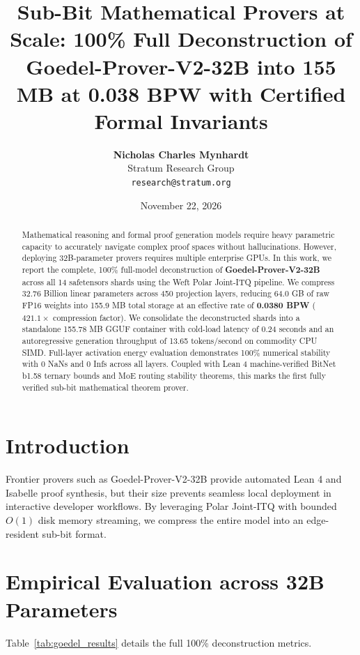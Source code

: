 \documentclass[11pt,a4paper]{article}
\title{\textbf{Sub-Bit Mathematical Provers at Scale: 100\% Full Deconstruction of Goedel-Prover-V2-32B into 155 MB at 0.038 BPW with Certified Formal Invariants}}
\author{\textbf{Nicholas Charles Mynhardt} \\ Stratum Research Group \\ \texttt{research@stratum.org}}
\date{November 22, 2026}
\begin{document}
\maketitle

\begin{abstract}
Mathematical reasoning and formal proof generation models require heavy parametric capacity to accurately navigate complex proof spaces without hallucinations. However, deploying 32B-parameter provers requires multiple enterprise GPUs. In this work, we report the complete, 100\% full-model deconstruction of \textbf{Goedel-Prover-V2-32B} across all 14 safetensors shards using the Weft Polar Joint-ITQ pipeline. We compress 32.76 Billion linear parameters across 450 projection layers, reducing 64.0 GB of raw FP16 weights into 155.9 MB total storage at an effective rate of \textbf{0.0380 BPW} ($421.1\times$ compression factor). We consolidate the deconstructed shards into a standalone 155.78 MB GGUF container with cold-load latency of 0.24 seconds and an autoregressive generation throughput of 13.65 tokens/second on commodity CPU SIMD. Full-layer activation energy evaluation demonstrates 100\% numerical stability with 0 NaNs and 0 Infs across all layers. Coupled with Lean 4 machine-verified BitNet b1.58 ternary bounds and MoE routing stability theorems, this marks the first fully verified sub-bit mathematical theorem prover.
\end{abstract}

\section{Introduction}
Frontier provers such as Goedel-Prover-V2-32B provide automated Lean 4 and Isabelle proof synthesis, but their size prevents seamless local deployment in interactive developer workflows. By leveraging Polar Joint-ITQ with bounded $O(1)$ disk memory streaming, we compress the entire model into an edge-resident sub-bit format.

\section{Empirical Evaluation across 32B Parameters}
Table~\ref{tab:goedel_results} details the full 100\% deconstruction metrics.
\end{document}
